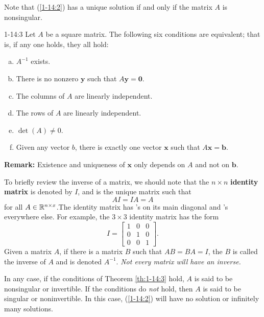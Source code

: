 \documentclass[letterpaper]{article}
\newcommand{\0}{\mathbf{0}}
\renewcommand{\b}{\mathbf{b}}
\newcommand{\x}{\mathbf{x}}
\begin{document}
\bigskip 

Note that (\ref{1-14:2}) has a unique solution if and only if the matrix $A$ is nonsingular. 

\begin{theorem}{}{1-14:3}
    Let $A$ be a square matrix. The following six conditions are equivalent; that is, if any one holds, they all hold: 
    \begin{enumerate}[(a)]
        \item $A^{-1}$ exists. 
        \item There is no nonzero $\mathbf{y}$ such that $A\mathbf{y} = \mathbf{0}$.
        \item The columns of $A$ are linearly independent.
        \item The rows of $A$ are linearly independent. 
        \item $\det(A) \neq 0$.
        \item Given any vector $b$, there is exactly one vector $\x$ such that $A\x = \b$. 
    \end{enumerate}
\end{theorem}
\textbf{Remark:} Existence and uniqueness of $\x$ only depends on $A$ and not on $\b$.

To briefly review the inverse of a matrix, we should note that the $n \times n$ \textbf{identity matrix} is denoted by $I$, and is the unique matrix such that 
\[AI = IA = A\]
for all $A \in \mathbb{R}^{n \times x}$.The identity matrix has 's on its main diagonal and 's everywhere else. For example, the $3 \times 3$ identity matrix has the form 
\[I = \begin{bmatrix}
    1 & 0 & 0 \\ 
    0 & 1 & 0 \\ 
    0 & 0 & 1
\end{bmatrix}.\]
Given a matrix $A$, if there is a matrix $B$ such that $AB = BA = I$, the $B$ is called the inverse of $A$ and is denoted $A^{-1}$. \emph{Not every matrix will have an inverse.}

\bigskip 

In any case, if the conditions of Theorem \ref{th:1-14:3} hold, $A$ is said to be nonsingular or invertible. If the conditions do \emph{not} hold, then $A$ is said to be singular or noninvertible. In this case, (\ref{1-14:2}) will have no solution or infinitely many solutions. 

\bigskip 
\end{document}
